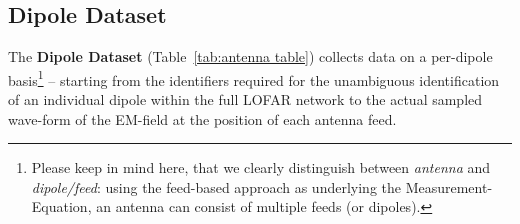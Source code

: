 \documentclass[a4paper,10pt,bibtotoc]{scrartcl}
\begin{document}
\clearpage


\begin{landscape}
\subsection{Dipole Dataset}
\label{sec:dipole dataset}

The \textbf{Dipole Dataset} (Table~\ref{tab:antenna table}) collects data on
a per-dipole basis\footnote{Please keep in mind here, that we clearly
  distinguish between \textsl{antenna} and \textsl{dipole/feed}: using the
  feed-based approach as underlying the Measurement-Equation, an antenna can
  consist of multiple feeds (or dipoles).} -- starting from the identifiers
required for the unambiguous identification of an individual dipole within
the full LOFAR network to the actual sampled wave-form of the EM-field at the
position of each antenna feed.


\end{landscape}
\end{document}
